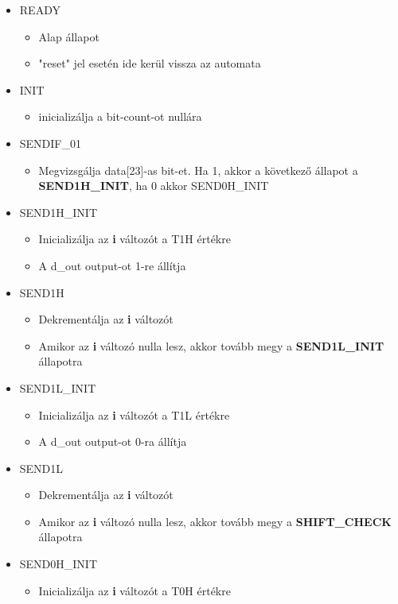 \begin{itemize}
\item READY
	\begin{itemize}
	\item Alap állapot 
	\item "reset" jel esetén ide kerül vissza az automata
	\end{itemize}
\item INIT
	\begin{itemize}
	\item inicializálja a bit-count-ot nullára
	\end{itemize}
\item SENDIF\_01
	\begin{itemize}
	\item Megvizsgálja data[23]-as bit-et. Ha 1, akkor a következő állapot a \textbf{SEND1H\_INIT}, ha 0 akkor SEND0H\_INIT
	\end{itemize}
\item SEND1H\_INIT
	\begin{itemize}
	\item Inicializálja az \textbf{i} változót a T1H értékre
	\item A d\_out output-ot 1-re állítja
	\end{itemize}
\item SEND1H
	\begin{itemize}
	\item Dekrementálja az \textbf{i} változót
	\item Amikor az \textbf{i} változó nulla lesz, akkor tovább megy a \textbf{SEND1L\_INIT} állapotra
	\end{itemize}
\item SEND1L\_INIT
	\begin{itemize}
	\item Inicializálja az \textbf{i} változót a T1L értékre
	\item A d\_out output-ot 0-ra állítja
	\end{itemize}
\item SEND1L
	\begin{itemize}
	\item Dekrementálja az \textbf{i} változót
	\item Amikor az \textbf{i} változó nulla lesz, akkor tovább megy a \textbf{SHIFT\_CHECK} állapotra
	\end{itemize}
\item SEND0H\_INIT
	\begin{itemize}
	\item Inicializálja az \textbf{i} változót a T0H értékre

\end{itemize}
\end{itemize}
